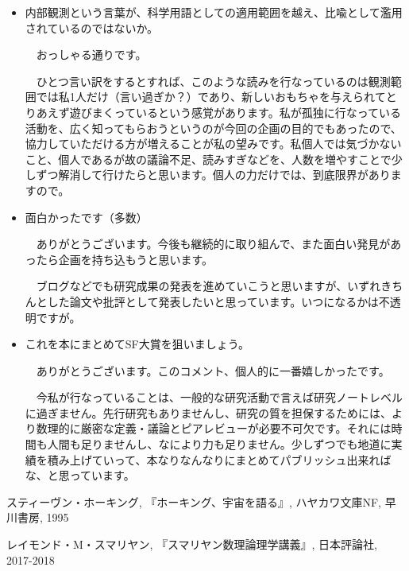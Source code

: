 \documentclass[10pt, a5paper, twoside]{jsarticle}
\begin{document}
		\begin{itemize}

			\item 内部観測という言葉が、科学用語としての適用範囲を越え、比喩として濫用されているのではないか。

			\vspace{1mm}

			　おっしゃる通りです。

			　ひとつ言い訳をするとすれば、このような読みを行なっているのは観測範囲では私1人だけ（言い過ぎか？）であり、新しいおもちゃを与えられてとりあえず遊びまくっているという感覚があります。私が孤独に行なっている活動を、広く知ってもらおうというのが今回の企画の目的でもあったので、協力していただける方が増えることが私の望みです。私個人では気づかないこと、個人であるが故の議論不足、読みすぎなどを、人数を増やすことで少しずつ解消して行けたらと思います。個人の力だけでは、到底限界がありますので。

			\vspace{2mm}

			\item 面白かったです（多数）

			\vspace{1mm}

			　ありがとうございます。今後も継続的に取り組んで、また面白い発見があったら企画を持ち込もうと思います。

			　ブログなどでも研究成果の発表を進めていこうと思いますが、いずれきちんとした論文や批評として発表したいと思っています。いつになるかは不透明ですが。

			\vspace{2mm}

			\item これを本にまとめてSF大賞を狙いましょう。

			\vspace{1mm}

			　ありがとうございます。このコメント、個人的に一番嬉しかったです。

			　今私が行なっていることは、一般的な研究活動で言えば研究ノートレベルに過ぎません。先行研究もありませんし、研究の質を担保するためには、より数理的に厳密な定義・議論とピアレビューが必要不可欠です。それには時間も人間も足りませんし、なにより力も足りません。少しずつでも地道に実績を積み上げていって、本なりなんなりにまとめてパブリッシュ出来ればな、と思っています。

		\end{itemize}


	\begin{thebibliography}{99}

		 スティーヴン・ホーキング, 『ホーキング、宇宙を語る』, ハヤカワ文庫NF, 早川書房, 1995
		
		 レイモンド・M・スマリヤン, 『スマリヤン数理論理学講義』, 日本評論社, 2017-2018

	\end{thebibliography}
\end{document}
